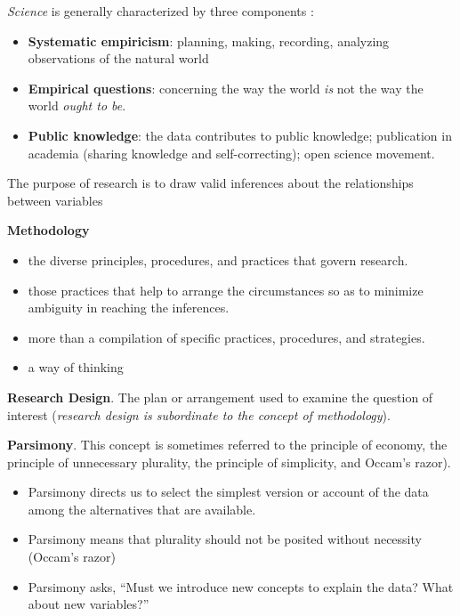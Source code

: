\documentclass[
  english,
]{book}
\providecommand{\tightlist}{%
  \setlength{\itemsep}{0pt}\setlength{\parskip}{0pt}}
\begin{document}
\emph{Science} is generally characterized by three components \citep{jhangiani_research_2019}:

\begin{itemize}
\tightlist
\item
  \textbf{Systematic empiricism}: planning, making, recording, analyzing observations of the natural world
\item
  \textbf{Empirical questions}: concerning the way the world \emph{is} not the way the world \emph{ought to be}.
\item
  \textbf{Public knowledge}: the data contributes to public knowledge; publication in academia (sharing knowledge and self-correcting); open science movement.
\end{itemize}

The purpose of research is to draw valid inferences about the relationships between variables \citep{kazdin_research_2017}

\textbf{Methodology}

\begin{itemize}
\tightlist
\item
  the diverse principles, procedures, and practices that govern research.
\item
  those practices that help to arrange the circumstances so as to minimize ambiguity in reaching the inferences.
\item
  more than a compilation of specific practices, procedures, and strategies.
\item
  a way of thinking
\end{itemize}

\textbf{Research Design}. The plan or arrangement used to examine the question of interest (\emph{research design is subordinate to the concept of methodology}).

\textbf{Parsimony}. This concept is sometimes referred to the principle of economy, the principle of unnecessary plurality, the principle of simplicity, and Occam's razor).

\begin{itemize}
\tightlist
\item
  Parsimony directs us to select the simplest version or account of the data among the alternatives that are available.
\item
  Parsimony means that plurality should not be posited without necessity (Occam's razor)
\item
  Parsimony asks, ``Must we introduce new concepts to explain the data? What about new variables?''
\end{itemize}
\end{document}
